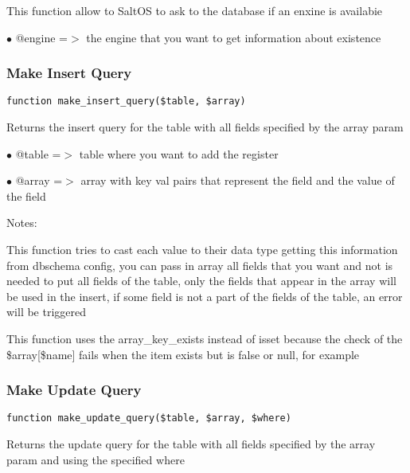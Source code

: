 \documentclass[a4paper]{article}
\begin{document}
This function allow to SaltOS to ask to the database if an enxine is
availabie

\begin{compactitem}
\item[\color{myblue}$\bullet$] @engine =$>$ the engine that you want to get information about existence
\end{compactitem}

\hypertarget{toc226}{}
\subsubsection{Make Insert Query}

\begin{lstlisting}
function make_insert_query($table, $array)
\end{lstlisting}

Returns the insert query for the table with all fields specified by the
array param

\begin{compactitem}
\item[\color{myblue}$\bullet$] @table =$>$ table where you want to add the register
\item[\color{myblue}$\bullet$] @array =$>$ array with key val pairs that represent the field and the value
          of the field
\end{compactitem}

Notes:

This function tries to cast each value to their data type getting this
information from dbschema config, you can pass in array all fields that
you want and not is needed to put all fields of the table, only the
fields that appear in the array will be used in the insert, if some
field is not a part of the fields of the table, an error will be
triggered

This function uses the array\_key\_exists instead of isset because the
check of the \$array[\$name] fails when the item exists but is false or
null, for example

\hypertarget{toc227}{}
\subsubsection{Make Update Query}

\begin{lstlisting}
function make_update_query($table, $array, $where)
\end{lstlisting}

Returns the update query for the table with all fields specified by the
array param and using the specified where
\end{document}
